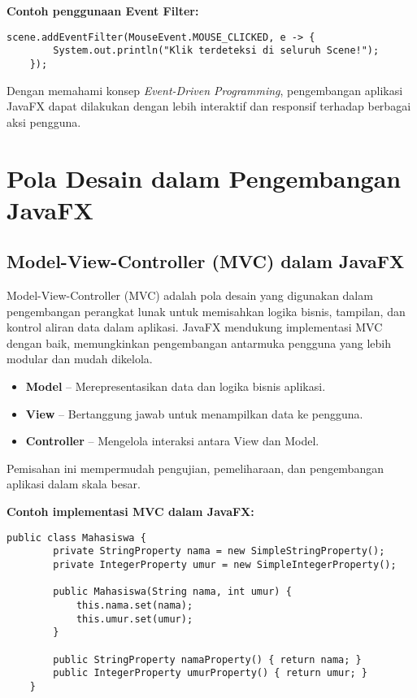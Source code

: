 \textbf{Contoh penggunaan Event Filter:}
\begin{lstlisting}[style=JavaStyle, caption=Menambahkan Event Filter pada Scene]
	scene.addEventFilter(MouseEvent.MOUSE_CLICKED, e -> {
		System.out.println("Klik terdeteksi di seluruh Scene!");
	});
\end{lstlisting}

Dengan memahami konsep \textit{Event-Driven Programming}, pengembangan aplikasi JavaFX dapat dilakukan dengan lebih interaktif dan responsif terhadap berbagai aksi pengguna.

\section{Pola Desain dalam Pengembangan JavaFX}

\subsection{Model-View-Controller (MVC) dalam JavaFX}

Model-View-Controller (MVC) adalah pola desain yang digunakan dalam pengembangan perangkat lunak untuk memisahkan logika bisnis, tampilan, dan kontrol aliran data dalam aplikasi. JavaFX mendukung implementasi MVC dengan baik, memungkinkan pengembangan antarmuka pengguna yang lebih modular dan mudah dikelola.

\begin{itemize}
	\item \textbf{Model} – Merepresentasikan data dan logika bisnis aplikasi.
	\item \textbf{View} – Bertanggung jawab untuk menampilkan data ke pengguna.
	\item \textbf{Controller} – Mengelola interaksi antara View dan Model.
\end{itemize}

Pemisahan ini mempermudah pengujian, pemeliharaan, dan pengembangan aplikasi dalam skala besar.

\textbf{Contoh implementasi MVC dalam JavaFX:}

\begin{lstlisting}[style=JavaStyle, caption=Model dalam aplikasi JavaFX]
	public class Mahasiswa {
		private StringProperty nama = new SimpleStringProperty();
		private IntegerProperty umur = new SimpleIntegerProperty();
		
		public Mahasiswa(String nama, int umur) {
			this.nama.set(nama);
			this.umur.set(umur);
		}
		
		public StringProperty namaProperty() { return nama; }
		public IntegerProperty umurProperty() { return umur; }
	}
\end{lstlisting}

